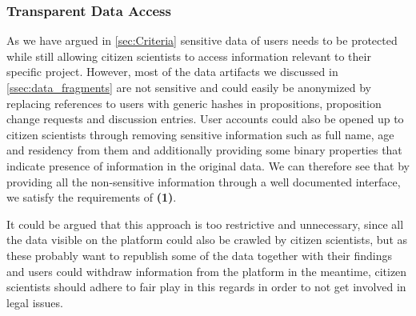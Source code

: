 % 
% 
% 




\subsubsection{Transparent Data Access}
\label{sec:Model_ResearchersAccess}

As we have argued in \autoref{sec:Criteria} sensitive data of users needs to be protected while still allowing citizen scientists to access information relevant to their specific project.
However, most of the data artifacts we discussed in \autoref{ssec:data_fragments} are not sensitive and could easily be anonymized by replacing references to users with generic hashes in propositions, proposition change requests and discussion entries.
User accounts could also be opened up to citizen scientists through removing sensitive information such as full name, age and residency from them and additionally providing some binary properties that indicate presence of information in the original data.
We can therefore see that by providing all the non-sensitive information through a well documented interface, we satisfy the requirements of \textbf{(1)}.

It could be argued that this approach is too restrictive and unnecessary, since all the data visible on the platform could also be crawled by citizen scientists, but as these probably want to republish some of the data together with their findings and users could withdraw information from the platform in the meantime, citizen scientists should adhere to fair play in this regards in order to not get involved in legal issues.

